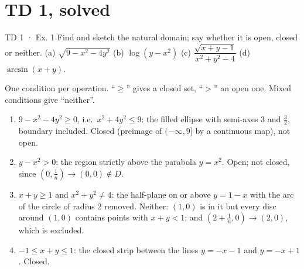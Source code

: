 \section{TD 1, solved}

\begin{problem}{TD 1 · Ex. 1}
Find and sketch the natural domain; say whether it is open, closed or neither.
(a) $\sqrt{9-x^2-4y^2}$ \quad (b) $\log(y-x^2)$ \quad
(c) $\dfrac{\sqrt{x+y-1}}{x^2+y^2-4}$ \quad (d) $\arcsin(x+y)$.
\end{problem}
\begin{hint}One condition per operation. ``$\ge$'' gives a closed set, ``$>$'' an open one.
Mixed conditions give ``neither''.\end{hint}
\begin{solution}
\begin{enumerate}[label=(\alph*)]
  \item $9-x^2-4y^2\ge0$, i.e.\ $x^2+4y^2\le9$: the filled ellipse with semi-axes $3$ and
  $\tfrac32$, boundary included. Closed (preimage of $(-\infty,9]$ by a continuous map), not open.
  \item $y-x^2>0$: the region strictly above the parabola $y=x^2$. Open; not closed, since
  $(0,\tfrac1n)\to(0,0)\notin D$.
  \item $x+y\ge1$ and $x^2+y^2\ne4$: the half-plane on or above $y=1-x$ with the arc of the
  circle of radius 2 removed. Neither: $(1,0)$ is in it but every disc around $(1,0)$ contains
  points with $x+y<1$; and $(2+\tfrac1n,0)\to(2,0)$, which is excluded.
  \item $-1\le x+y\le1$: the closed strip between the lines $y=-x-1$ and $y=-x+1$. Closed.
\end{enumerate}
\begin{center}
\end{center}
\end{solution}
